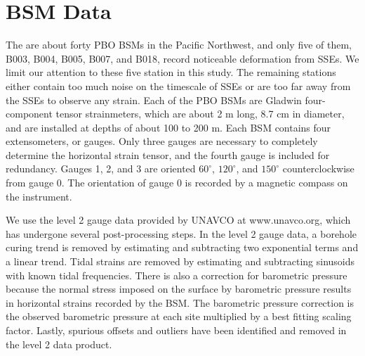 \section{BSM Data}
The are about forty PBO BSMs in the Pacific Northwest, and only five
of them, B003, B004, B005, B007, and B018, record noticeable
deformation from SSEs. We limit our attention to these five station in
this study.  The remaining stations either contain too much noise on
the timescale of SSEs or are too far away from the SSEs to observe any
strain. Each of the PBO BSMs are Gladwin four-component tensor
strainmeters, which are about 2 m long, 8.7 cm in diameter, and are
installed at depths of about 100 to 200 m. Each BSM contains four
extensometers, or gauges. Only three gauges are necessary to
completely determine the horizontal strain tensor, and the fourth
gauge is included for redundancy. Gauges 1, 2, and 3 are oriented
$60^\circ$, $120^\circ$, and $150^\circ$ counterclockwise from gauge
0. The orientation of gauge 0 is recorded by a magnetic compass on the
instrument.

We use the level 2 gauge data provided by UNAVCO at www.unavco.org,
which has undergone several post-processing steps. In the level 2
gauge data, a borehole curing trend is removed by estimating and
subtracting two exponential terms and a linear trend. Tidal strains
are removed by estimating and subtracting sinusoids with known tidal
frequencies. There is also a correction for barometric pressure
because the normal stress imposed on the surface by barometric
pressure results in horizontal strains recorded by the BSM. The
barometric pressure correction is the observed barometric pressure at
each site multiplied by a best fitting scaling factor. Lastly,
spurious offsets and outliers have been identified and removed in the
level 2 data product.

